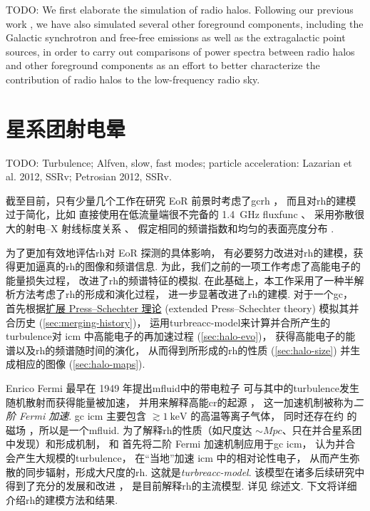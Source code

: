 TODO:
We first elaborate the simulation of radio halos.
Following our previous work \cite{wang2010}, we have also simulated
several other foreground components, including the Galactic synchrotron
and free-free emissions as well as the extragalactic point sources,
in order to carry out comparisons of power spectra between radio halos
and other foreground components as an effort to better characterize the
contribution of radio halos to the low-frequency radio sky.


\section{星系团射电晕}
\label{sec:radio-halos}

TODO: Turbulence; Alfven, slow, fast modes; particle acceleration:
Lazarian et al. 2012, SSRv;
Petrosian 2012, SSRv.

截至目前，只有少量几个工作在研究 EoR 前景时考虑了\ac{gc}\ac{rh}
\cite{diMatteo2004,gleser2008,jelic2008}，
而且对\ac{rh}的建模过于简化，比如
直接使用在低流量端很不完备的 \SI{1.4}{\GHz} \ac{fluxfunc} \cite{gleser2008}、
采用弥散很大的射电--X 射线标度关系 \cite{jelic2008}、
假定相同的频谱指数和均匀的表面亮度分布 \cite{gleser2008,jelic2008}.

为了更加有效地评估\ac{rh}对 EoR 探测的具体影响，
有必要努力改进对\ac{rh}的建模，获得更加逼真的\ac{rh}的图像和频谱信息.
为此，我们之前的一项工作\cite{wang2010}考虑了高能电子的能量损失过程，
改进了\ac{rh}的频谱特征的模拟.
在此基础上，本工作采用了一种半解析方法考虑了\ac{rh}的形成和演化过程，
进一步显著改进了\ac{rh}的建模.
对于一个\ac{gc}，
首先根据\uline{扩展 Press--Schechter 理论} (extended Press--Schechter theory)
模拟其并合历史 (\autoref{sec:merging-history})，
运用\ac{turbreacc-model}来计算并合所产生的\ac{turbulence}对
\ac{icm} 中高能电子的再加速过程 (\autoref{sec:halo-evo})，
获得高能电子的能谱以及\ac{rh}的频谱随时间的演化，
从而得到所形成的\ac{rh}的性质 (\autoref{sec:halo-size})
并生成相应的图像 (\autoref{sec:halo-maps}).

Enrico Fermi 最早在 1949 年提出\ac{mfluid}中的带电粒子
可与其中的\ac{turbulence}发生随机散射而获得能量被加速，
并用来解释高能\ac{cr}的起源 \cite{fermi1949,fermi1954,davis1956}，
这一加速机制被称为\emph{二阶 Fermi 加速}.
\ac{gc} \ac{icm} 主要包含 $\gtrsim \SI{1}{\keV}$ 的高温等离子气体，
同时还存在约 \si{\uG} 的磁场 \cite{govoni2004,ryu2008}，所以是一个\ac{mfluid}.
为了解释\ac{rh}的性质（如尺度达 $\sim\si{Mpc}$、只在并合星系团中发现）和形成机制，
 和 
首先将二阶 Fermi 加速机制应用于\ac{gc} \ac{icm}，
认为并合会产生大规模的\ac{turbulence}，
在\enquote{当地}加速 \ac{icm} 中的相对论性电子，
从而产生弥散的同步辐射，形成大尺度的\ac{rh}.
这就是\emph{\ac{turbreacc-model}}.
该模型在诸多后续研究中得到了充分的发展和改进
\cite{fujita2003,brunetti2004,cassano2005,brunetti2007,brunetti2011}，
是目前解释\ac{rh}的主流模型.
详见  综述文.
下文将详细介绍\ac{rh}的建模方法和结果.


